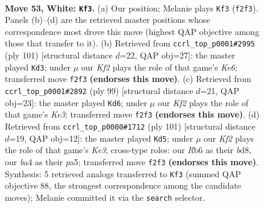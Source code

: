 \documentclass[11pt]{article}
\begin{document}
\clearpage

\begin{figure}[p]\centering
\begin{subfigure}{0.46\textwidth}\centering
\resizebox{\linewidth}{!}{%
\newchessgame
\chessboard[
  setfen={8/3k4/1R6/pp4r1/b1p5/P1P5/1B3K2/8 w - - 12 53},
  showmover=false,
  pgfstyle=straightmove, color=movearrow, markmove={f2-f3}
]}
\caption{}
\end{subfigure}\hfill
\begin{subfigure}{0.46\textwidth}\centering
\resizebox{\linewidth}{!}{%
\newchessgame
\chessboard[
  setfen={8/8/5R2/7p/1B4bP/P1P1k1P1/r7/6K1 b - - 26 51},
  showmover=false,
  pgfstyle=straightmove, color=movearrow, markmove={e3-d3}
]}
\caption{}
\end{subfigure}
\\[4pt]
\begin{subfigure}{0.46\textwidth}\centering
\resizebox{\linewidth}{!}{%
\newchessgame
\chessboard[
  setfen={8/pB6/4k3/rP6/7p/6bP/1R2K1P1/8 b - - 2 50},
  showmover=false,
  pgfstyle=straightmove, color=movearrow, markmove={e6-d6}
]}
\caption{}
\end{subfigure}\hfill
\begin{subfigure}{0.46\textwidth}\centering
\resizebox{\linewidth}{!}{%
\newchessgame
\chessboard[
  setfen={3B4/8/4kpp1/P6p/4b2P/2R3P1/r7/4K3 b - - 2 51},
  showmover=false,
  pgfstyle=straightmove, color=movearrow, markmove={e6-d5}
]}
\caption{}
\end{subfigure}
\caption{\textbf{Move 53, White: \texttt{Kf3}.} (a) Our position; Melanie plays \texttt{Kf3} (\texttt{f2f3}). Panels (b)--(d) are the retrieved master positions whose correspondence most drove this move (highest QAP objective among those that transfer to it). (b) Retrieved from \texttt{ccrl\_top\_p0001\#2995} (ply 101) [structural distance $d$=22, QAP obj=27]: the master played \texttt{Kd3}; under $\mu$ our \emph{Kf2} plays the role of that game's \emph{Ke6}; transferred move \texttt{f2f3} \textbf{(endorses this move)}. (c) Retrieved from \texttt{ccrl\_top\_p0001\#2892} (ply 99) [structural distance $d$=21, QAP obj=23]: the master played \texttt{Kd6}; under $\mu$ our \emph{Kf2} plays the role of that game's \emph{Ke3}; transferred move \texttt{f2f3} \textbf{(endorses this move)}. (d) Retrieved from \texttt{ccrl\_top\_p0000\#1712} (ply 101) [structural distance $d$=19, QAP obj=12]: the master played \texttt{Kd5}; under $\mu$ our \emph{Kf2} plays the role of that game's \emph{Ke3}; cross-type roles: our \emph{R}b6 as their \emph{b}d8, our \emph{b}a4 as their \emph{p}a5; transferred move \texttt{f2f3} \textbf{(endorses this move)}. Synthesis: 5 retrieved analogs transferred to \texttt{Kf3} (summed QAP objective 88, the strongest correspondence among the candidate moves); Melanie committed it via the \texttt{search} selector.}
\label{fig:thought-m104}
\end{figure}
\end{document}
